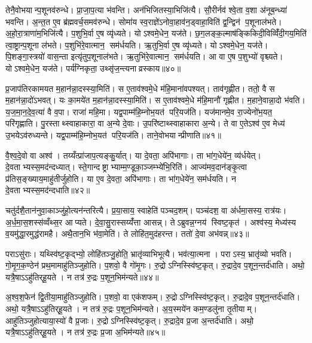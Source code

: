 तेनै॒वोभयान्प॒शूनव॑रुन्धे। प्रा॒जा॒प॒त्या भ॑वन्ति। अन॑भिजितस्या॒भिजि॑त्यै। सौ॒रीर्नव॑ श्वे॒ता व॒शा अ॑नूब॒न्ध्या॑ भवन्ति। अ॒न्त॒त ए॒व ब्र॑ह्मवर्च॒समव॑रुन्धे। सोमा॑य स्व॒राज्ञे॑ऽनोवा॒हाव॑न॒ड्वाहा॒विति॑ द्व॒न्द्विन॑ प॒शूनाल॑भते। अ॒हो॒रा॒त्राणा॑म॒भिजि॑त्यै। प॒शुभि॒र्वा ए॒ष व्यृ॑ध्यते। योऽश्वमे॒धेन॒ यज॑ते। छ॒ग॒लङ्क॒ल्माष॑ङ्किकिदी॒विव्विँ॑दी॒गय॒मिति॑ त्वा॒ष्ट्रान्प॒शूना ल॑भते। प॒शुभि॑रे॒वात्मान॒ सम॑र्धयति। ऋ॒तुभि॒र्वा ए॒ष व्यृ॑ध्यते। योऽश्वमे॒धेन॒ यज॑ते। पि॒शङ्गा॒स्त्रयो॑ वास॒न्ता इत्यृ॑तुप॒शूनाल॑भते। ऋ॒तुभि॑रे॒वात्मान॒ सम॑र्धयति। आ वा ए॒ष प॒शुभ्यो॑ वृश्च्यते। योऽश्वमे॒धेन॒ यज॑ते। पर्य॑ग्निकृता॒ उथ्सृ॑ज॒न्त्यनाव्रस्काय॥४०॥\anuvakamend[ल॒भ्य॒न्ते॒ ल॒भ॒ते॒ त्वा॒ष्ट्रान्प॒शूनाल॑भते॒ऽष्टौ च॑]

प्र॒जाप॑तिरकामयत म॒हान॑न्ना॒दस्स्या॒मिति॑। स ए॒ताव॑श्वमे॒धे म॑हि॒माना॑वपश्यत्। ताव॑गृह्णीत। ततो॒ वै स म॒हान॑न्ना॒दो॑ऽभवत्। यः का॒मये॑त म॒हान॑न्ना॒दस्स्या॒मिति॑। स ए॒ताव॑श्वमे॒धे म॑हि॒मानौ॑ गृह्णीत। म॒हाने॒वान्ना॒दो भ॑वति। य॒ज॒मा॒न॒दे॒व॒त्या॑ वै व॒पा। राजा॑ महि॒मा। यद्व॒पाम्म॑हि॒म्नोभ॒यत॑ परि॒यज॑ति। यज॑मानमे॒व रा॒ज्येनो॑भ॒यत॒ परि॑गृह्णाति। पु॒रस्ताथ्स्वाहाकारा॒ वा अ॒न्ये दे॒वाः। उ॒परि॑ष्टाथ्स्वाहाकारा अ॒न्ये। ते वा ए॒तेऽश्व॑ ए॒व मेध्य॑ उ॒भयेऽव॑रुध्यन्ते। यद्व॒पाम्म॑हि॒म्नोभ॒यत॑ परि॒यज॑ति। ताने॒वोभयान्प्रीणाति॥४१॥\anuvakamend[प॒रि॒यज॑ति॒ षट्च॑]

वै॒श्व॒दे॒वो वा अश्व॑। तय्यँत्प्रा॑जाप॒त्यङ्कु॒र्यात्। या दे॒वता॒ अपि॑भागाः। ता भा॑ग॒धेये॑न॒ व्य॑र्धयेत्। दे॒वताभ्यस्स॒मद॑न्दध्यात्। स्ते॒गान्दष्ट्राभ्याम्म॒ण्डूका॒ञ्जम्भ्ये॑भि॒रिति॑। आज्य॑मव॒दान॑ङ्कृ॒त्वा प्र॑तिस॒ङ्ख्याय॒माहु॑तीर्जुहोति। या ए॒व दे॒वता॒ अपि॑भागाः। ता भा॑ग॒धेये॑न॒ सम॑र्धयति। न दे॒वताभ्यस्स॒मद॑न्दधाति॥४२॥

चतु॑र्दशै॒तान॑नुवा॒काञ्जु॑हो॒त्यन॑न्तरित्यै। प्र॒या॒साय॒ स्वाहेति॑ पञ्चद॒शम्। पञ्च॑दश॒ वा अ॑र्धमा॒सस्य॒ रात्र॑यः। अ॒र्ध॒मा॒स॒शस्स॑व्वँथ्स॒र आप्यते। दे॒वा॒सु॒रास्सय्यँ॑त्ता आसन्न्। तेऽब्रुवन्न॒ग्नय॑ स्विष्ट॒कृत॑। अश्व॑स्य॒ मेध्य॑स्य व॒यमु॑द्धा॒रमुद्ध॑रामहै। अथै॒तान॒भि भ॑वा॒मेति॑। ते लोहि॑त॒मुद॑हरन्त। ततो॑ दे॒वा अभ॑वन्न्॥४३॥

पराऽसु॑राः। यथ्स्वि॑ष्ट॒कृद्भ्यो॒ लोहि॑तञ्जु॒होति॒ भ्रातृ॑व्याभिभूत्यै। भव॑त्या॒त्मना। पराऽस्य॒ भ्रातृ॑व्यो भवति। गो॒मृ॒ग॒क॒ण्ठेन॑ प्रथ॒मामाहु॑तिञ्जुहोति। प॒शवो॒ वै गो॑मृ॒गः। रु॒द्रोऽग्निस्स्वि॑ष्ट॒कृत्। रु॒द्रादे॒व प॒शून॒न्तर्द॑धाति। अथो॒ यत्रै॒षाऽऽहु॑तिर्‌हू॒यते। न तत्र॑ रु॒द्रः प॒शून॒भिम॑न्यते॥४४॥

अ॒श्व॒श॒फेन॑ द्वि॒तीया॒माहु॑तिञ्जुहोति। प॒शवो॒ वा एक॑शफम्। रु॒द्रोऽग्निस्स्वि॑ष्ट॒कृत्। रु॒द्रादे॒व प॒शून॒न्तर्द॑धाति। अथो॒ यत्रै॒षाऽऽहु॑तिर्‌हू॒यते। न तत्र॑ रु॒द्रः प॒शून॒भिम॑न्यते। अ॒य॒स्मये॑न कम॒ण्डलु॑ना तृ॒तीयाम्। आहु॑तिञ्जुहोत्याया॒स्यो॑ वै प्र॒जाः। रु॒द्रोऽग्निस्स्वि॑ष्ट॒कृत्। रु॒द्रादे॒व प्र॒जा अ॒न्तर्द॑धाति। अथो॒ यत्रै॒षाऽऽहु॑तिर्‌हू॒यते। न तत्र॑ रु॒द्रः प्र॒जा अ॒भिम॑न्यते॥४५॥\anuvakamend[द॒धा॒त्यभ॑वन्मन्यते प्र॒जा अ॒न्तर्द॑धाति॒ द्वे च॑ ]

